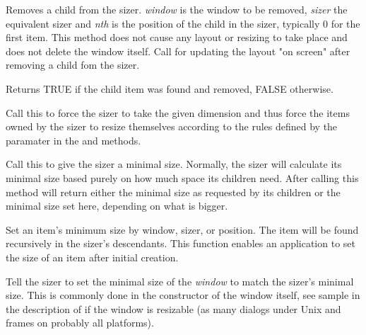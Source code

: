 

Removes a child from the sizer. {\it window} is the window to be removed, {\it sizer} the
equivalent sizer and {\it nth} is the position of the child in the sizer, typically 0 for
the first item. This method does not cause any layout or resizing to take place and does
not delete the window itself. Call  for updating
the layout "on screen" after removing a child fom the sizer.

Returns TRUE if the child item was found and removed, FALSE otherwise.

\label{wxsizersetdimension}


Call this to force the sizer to take the given dimension and thus force the items owned
by the sizer to resize themselves according to the rules defined by the paramater in the 
 and  methods.

\label{wxsizersetminsize}



Call this to give the sizer a minimal size. Normally, the sizer will calculate its
minimal size based purely on how much space its children need. After calling this
method  will return either the minimal size
as requested by its children or the minimal size set here, depending on what is
bigger.

\label{wxsizersetitemminsize}




Set an item's minimum size by window, sizer, or position. The item will be found recursively
in the sizer's descendants. This function enables an application to set the size of an item
after initial creation.

\label{wxsizersetsizehints}


Tell the sizer to set the minimal size of the {\it window} to match the sizer's minimal size.
This is commonly done in the constructor of the window itself, see sample in the description
of  if the window is resizable (as many dialogs under Unix and
frames on probably all platforms).

